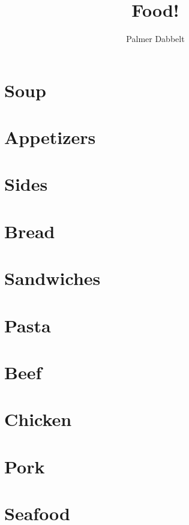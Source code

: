 \documentclass{book}
\author{Palmer Dabbelt}
\title{Food!}
\begin{document}
\maketitle
\tableofcontents
\contentsskip

\newcommand{\maketitle}{}
\renewcommand{\tableofcontents}{}
\newcommand{\author}[1]{}
\newcommand{\title}[1]{}
\renewcommand{\contentsskip}{}
\renewcommand{\bref}[1]{\ref{#1}}

\chapter{Soup}



\chapter{Appetizers}


\chapter{Sides}


\chapter{Bread}




\chapter{Sandwiches}



\chapter{Pasta}






\chapter{Beef}



\chapter{Chicken}






\chapter{Pork}



\chapter{Seafood}

\end{document}
